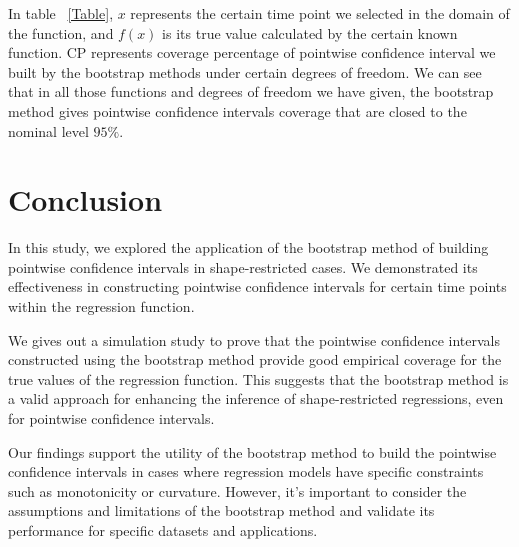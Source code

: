 \documentclass[12pt]{article}
\begin{document}
In table ~\ref{Table}, \(x\) represents the certain time point we selected in the domain of the function, and \(f(x)\) is its true value calculated by the certain known function. CP represents coverage percentage of pointwise confidence interval we built by the bootstrap methods under certain degrees of freedom. We can see that in all those functions and degrees of freedom we have given, the bootstrap method gives pointwise confidence intervals coverage that are closed to the nominal level \(95\%\).


\section{Conclusion}
\label{Conclusion}
In this study, we explored the application of the bootstrap method of building pointwise confidence intervals in shape-restricted cases. We demonstrated its effectiveness in constructing pointwise confidence intervals for certain time points within the regression function. 

We gives out a simulation study to prove that the pointwise confidence intervals constructed using the bootstrap method provide good empirical coverage for the true values of the regression function. This suggests that the bootstrap method is a valid approach for enhancing the inference of shape-restricted regressions, even for pointwise confidence intervals.

Our findings support the utility of the bootstrap method to build the pointwise confidence intervals in cases where regression models have specific constraints such as monotonicity or curvature. However, it's important to consider the assumptions and limitations of the bootstrap method and validate its performance for specific datasets and applications.



\end{document}
